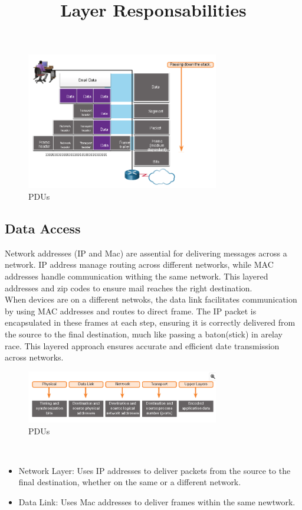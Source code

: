 \documentclass[a4paper,11pt]{article}
\begin{document}
\begin{figure}[h!]
    \centering
    \includegraphics[width=0.75\textwidth]{7.png}
    \caption{PDUs}
    \label{fig:cap1}
\end{figure}

\subsection{Data Access}
Network addresses (IP and Mac) are assential for delivering messages across a network. IP address manage routing across different networks, while MAC addresses handle communication withing the same network. This layered addresses and zip codes to ensure mail reaches the right destination.\\

When devices are on a different netwoks, the data link facilitates communication by using MAC addresses and routes to direct frame. The IP packet is encapsulated in these  frames at each step, ensuring it is correctly delivered from the source to the final destination, much like passing a baton(stick) in arelay race. This layered approach ensures accurate and efficient date transmission across networks.\\

\begin{figure}[h!]
    \centering
    \includegraphics[width=0.75\textwidth]{8.png}
    \caption{PDUs}
    \label{fig:cap1}
\end{figure}

\title{Layer Responsabilities}\\
\begin{itemize}
    \item Network Layer: Uses IP addresses to deliver packets from the source to the final destination, whether on the same or a different network.\\
    \item Data Link: Uses Mac addresses to deliver frames within the same newtwork.\\
\end{itemize}
\end{document}
